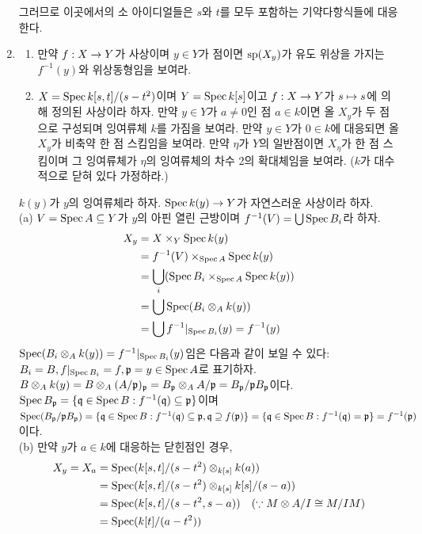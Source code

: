 \begin{enumerate}[label=\tb{3.\arabic*.},itemindent=0mm,itemsep=4mm]
	그러므로 이곳에서의 소 아이디얼들은 $s$와 $t$를 모두 포함하는 기약다항식들에 대응한다.
	\item {}
	\begin{enumerate}[label=(\alph*)]
	\item 만약 $f:X\ra Y$가 사상이며 $y\in Y$가 점이면 $\sp(X_y)$가 유도 위상을 가지는 $f^{-1}(y)$와 위상동형임을 보여라.
	\item $X=\Spec k[s,t]/(s-t^2)$이며 $Y=\Spec k[s]$이고 $f:X\ra Y$가 $s\mt s$에 의해 정의된 사상이라 하자.
	만약 $y\in Y$가 $a\ne 0$인 점 $a\in k$이면 올 $X_y$가 두 점으로 구성되며 잉여류체 $k$를 가짐을 보여라.
	만약 $y\in Y$가 $0\in k$에 대응되면 올 $X_y$가 비축약 한 점 스킴임을 보여라.
	만약 $\eta$가 $Y$의 일반점이면 $X_\eta$가 한 점 스킴이며 그 잉여류체가 $\eta$의 잉여류체의 차수 2의 확대체임을 보여라.
	($k$가 대수적으로 닫혀 있다 가정하라.)
	\end{enumerate}
	\sol $k(y)$가 $y$의 잉여류체라 하자. $\Spec k(y)\ra Y$가 자연스러운 사상이라 하자.\\
	(a) $V=\Spec A\bseq Y$가 $y$의 아핀 열린 근방이며 $f^{-1}(V)=\bigcup\Spec B_i$라 하자.
	\begin{align*}
	X_y&=X\times_Y\Spec k(y)\\
	&=f^{-1}(V)\times_{\Spec A}\Spec k(y)\\
	&=\bigcup_i(\Spec B_i\times_{\Spec A}\Spec k(y))\\
	&=\bigcup\Spec(B_i\otimes_Ak(y))\\
	&=\bigcup f^{-1}\rest_{\Spec B_i}(y)=f^{-1}(y)
	\end{align*}
	$\Spec(B_i\otimes_Ak(y))=f^{-1}\rest_{\Spec B_i}(y)$임은 다음과 같이 보일 수 있다:\\
	$B_i=B,f\rest_{\Spec B_i}=f,\mf p=y\in\Spec A$로 표기하자.
	$B\otimes_Ak(y)=B\otimes_A(A/\mf p)_{\mf p}=B_{\mf p}\otimes_AA/\mf p=B_{\mf p}/\mf pB_{\mf p}$이다.
	$\Spec B_{\mf p}=\sx{\mf q\in\Spec B}{f^{-1}(\mf q)\bseq\mf p}$이며
	$\Spec(B_{\mf p}/\mf pB_{\mf p})=\sx{\mf q\in\Spec B}{f^{-1}(\mf q)\bseq\mf p,\mf q\pseq f(\mf p)}
	=\sx{\mf q\in\Spec B}{f^{-1}(\mf q)=\mf p}=f^{-1}(\mf p)$이다.\\
	(b) 만약 $y$가 $a\in k$에 대응하는 닫힌점인 경우,
	\begin{align*}
	X_y=X_a&=\Spec(k[s,t]/(s-t^2)\otimes_{k[s]}k(a))\\
	&=\Spec(k[s,t]/(s-t^2)\otimes_{k[s]}k[s]/(s-a))\\
	&=\Spec(k[s,t]/(s-t^2,s-a))\quad(\because M\otimes A/I\cong M/IM)\\
	&=\Spec(k[t]/(a-t^2))

\end{align*}
\end{enumerate}
